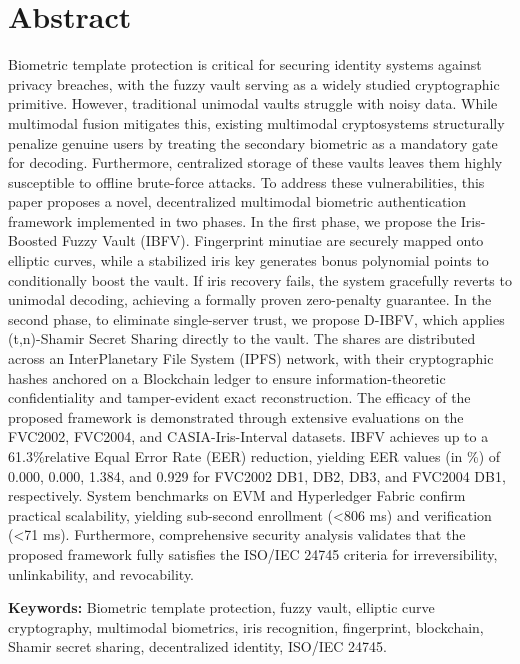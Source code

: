 \chapter*{\center \Large Abstract}

Biometric template protection is critical for securing identity systems against privacy breaches, with the fuzzy vault serving as a widely studied cryptographic primitive. However, traditional unimodal vaults struggle with noisy data. While multimodal fusion mitigates this, existing multimodal cryptosystems structurally penalize genuine users by treating the secondary biometric as a mandatory gate for decoding. Furthermore, centralized storage of these vaults leaves them highly susceptible to offline brute-force attacks. To address these vulnerabilities, this paper proposes a novel, decentralized multimodal biometric authentication framework implemented in two phases. In the first phase, we propose the Iris-Boosted Fuzzy Vault (IBFV). Fingerprint minutiae are securely mapped onto elliptic curves, while a stabilized iris key generates bonus polynomial points to conditionally boost the vault. If iris recovery fails, the system gracefully reverts to unimodal decoding, achieving a formally proven zero-penalty guarantee. In the second phase, to eliminate single-server trust, we propose D-IBFV, which applies (t,n)-Shamir Secret Sharing directly to the vault. The shares are distributed across an InterPlanetary File System (IPFS) network, with their cryptographic hashes anchored on a Blockchain ledger to ensure information-theoretic confidentiality and tamper-evident exact reconstruction. The efficacy of the proposed framework is demonstrated through extensive evaluations on the FVC2002, FVC2004, and CASIA-Iris-Interval datasets. IBFV achieves up to a 61.3\%relative Equal Error Rate (EER) reduction, yielding EER values (in \%) of 0.000, 0.000, 1.384, and 0.929 for FVC2002 DB1, DB2, DB3, and FVC2004 DB1, respectively. System benchmarks on EVM and Hyperledger Fabric confirm practical scalability, yielding sub-second enrollment (<806 ms) and verification (<71 ms). Furthermore, comprehensive security analysis validates that the proposed framework fully satisfies the ISO/IEC 24745 criteria for irreversibility, unlinkability, and revocability.

\vspace{1cm}

\noindent
\textbf{Keywords:} Biometric template protection, fuzzy vault, elliptic curve
cryptography, multimodal biometrics, iris recognition, fingerprint, blockchain,
Shamir secret sharing, decentralized identity, ISO/IEC 24745.
